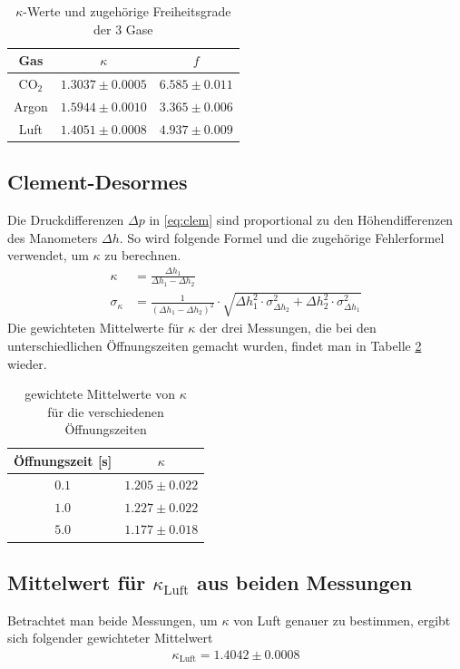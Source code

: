 \documentclass[12pt,a4paper,titlepage,headinclude,bibtotoc]{scrartcl}
\begin{document}
\begin{table}[!hbt]
	\centering
	\begin{tabular}{|c|c|c|}
		\hline
		Gas & $\kappa$ & $f$\\
		\hline
		\hline		
		CO$_2$ & $1.3037 \pm 0.0005$ & $6.585 \pm 0.011$ \\
		Argon & $1.5944 \pm 0.0010$ & $3.365 \pm 0.006$ \\
		Luft & $1.4051 \pm 0.0008$ & $4.937 \pm 0.009$ \\		
		\hline
	\end{tabular}
	\caption{$\kappa$-Werte und zugehörige Freiheitsgrade der 3 Gase}
	\label{tab:RuechardtKappaF}
\end{table}


\subsection{Clement-Desormes}
Die Druckdifferenzen $\Delta p$ in \eqref{eq:clem} sind proportional zu den Höhendifferenzen des Manometers $\Delta h$.
So wird folgende Formel und die zugehörige Fehlerformel verwendet, um $\kappa$ zu berechnen.
\begin{align}
	\kappa&=\frac{\Delta h_{1}}{\Delta h_{1} - \Delta h_{2}}\\
	\sigma_{\kappa}&=\frac{1}{\left(\Delta h_{1} - \Delta h_{2}\right)^{2}} \cdot \sqrt{\Delta h_{1}^{2} \cdot \sigma_{\Delta h_2}^{2} + \Delta h_{2}^{2} \cdot \sigma_{\Delta h_1}^{2}}
\end{align}
Die gewichteten Mittelwerte für $\kappa$ der drei Messungen, die bei den unterschiedlichen Öffnungszeiten gemacht wurden, findet man in Tabelle \ref{tab:CDKappa} wieder.
\begin{table}[!htb]
	\centering
	\begin{tabular}{|c|c|}
		\hline
		Öffnungszeit [s] & $\kappa$\\
		\hline
		$ 0.1 $ & $ 1.205 \pm 0.022 $ \\
		$ 1.0 $ & $ 1.227 \pm 0.022 $ \\
		$ 5.0 $ & $ 1.177 \pm 0.018 $ \\
		\hline
	\end{tabular}
	\caption{gewichtete Mittelwerte von $\kappa$ \\ für die verschiedenen Öffnungszeiten}
	\label{tab:CDKappa}
\end{table}

\subsection{Mittelwert für $\kappa_\text{Luft}$ aus beiden Messungen}
Betrachtet man beide Messungen, um $\kappa$ von Luft genauer zu bestimmen, ergibt sich folgender gewichteter Mittelwert
\begin{align}
	\kappa_\text{Luft}=1.4042 \pm 0.0008
\end{align}
\end{document}
